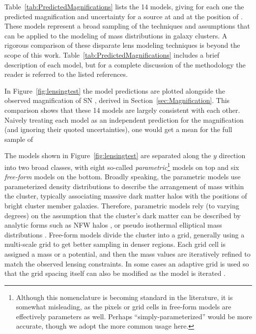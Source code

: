 Table~\ref{tab:PredictedMagnifications} lists the 14 models,
giving for each one the predicted magnification and uncertainty for a
source at  and at the position of \tomas.  These models
represent a broad sampling of the techniques and assumptions that can
be applied to the modeling of mass distributions in galaxy clusters. A
rigorous comparison of these disparate lens modeling techniques is
beyond the scope of this work. Table~\ref{tab:PredictedMagnifications}
includes a brief description of each model, but for a complete
discussion of the methodology the reader is referred to the listed
references.

In Figure~\ref{fig:lensingtest} the model predictions are plotted
alongside the observed magnification of SN \tomas, derived in
Section~\ref{sec:Magnification}.  This comparison shows that these 14
models are largely consistent with each other. Naively treating each
model as an independent prediction for the magnification (and ignoring
their quoted uncertainties), one would get a mean for the full sample
of 

The models shown in Figure~\ref{fig:lensingtest} are separated along
the $y$ direction into two broad classes, with eight so-called {\it
parametric}\footnote{Although this nomenclature is becoming standard
in the literature, it is somewhat misleading, as the pixels or grid
cells in free-form models are effectively parameters as well. Perhaps
``simply-parameterized'' would be more accurate, though we adopt the
more common usage here.}  models on top and six {\it free-form} models
on the bottom.  Broadly speaking, the parametric models use
parameterized density distributions to describe the arrangement of
mass within the cluster, typically associating massive dark matter
halos with the positions of bright cluster member galaxies. Therefore,
parametric models rely (to varying degrees) on the assumption that the
cluster's dark matter can be described by analytic forms such as NFW
halos \citep{Navarro:1997}, or pseudo isothermal elliptical mass
distributions \citep{Kassiola:1993}.  Free-form models divide the
cluster into a grid, generally using a
multi-scale grid to get better sampling in denser regions. Each grid cell
is assigned a mass or a potential, and then the mass values are
iteratively refined to match the observed lensing
constraints. In some cases an adaptive grid is used so
that the grid spacing itself can also be modified as the model is
iterated \citep[e.g.][]{Liesenborgs:2006,Merten:2009}.

